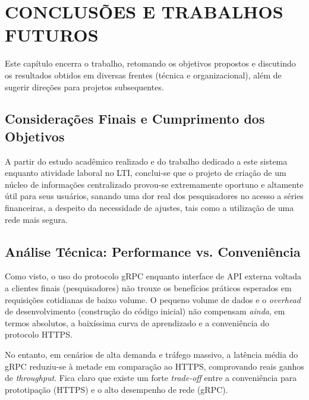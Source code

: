 \chapter{CONCLUSÕES E TRABALHOS FUTUROS}

Este capítulo encerra o trabalho, retomando os objetivos propostos e discutindo os resultados obtidos em diversas frentes (técnica e organizacional), além de sugerir direções para projetos subsequentes.

\section{Considerações Finais e Cumprimento dos Objetivos}

A partir do estudo acadêmico realizado e do trabalho dedicado a este sistema enquanto atividade laboral no LTI, conclui-se que o projeto de criação de um núcleo de informações centralizado provou-se extremamente oportuno e altamente útil para seus usuários, sanando uma dor real dos pesquisadores no acesso a séries financeiras, a despeito da necessidade de ajustes, tais como a utilização de uma rede mais segura.

\section{Análise Técnica: Performance vs. Conveniência}

Como visto, o uso do protocolo gRPC enquanto interface de API externa voltada a clientes finais (pesquisadores) não trouxe os benefícios práticos esperados em requisições cotidianas de baixo volume. O pequeno volume de dados e o \textit{overhead} de desenvolvimento (construção do código inicial) não compensam \textit{ainda}, em termos absolutos, a baixíssima curva de aprendizado e a conveniência do protocolo HTTPS. 

No entanto, em cenários de alta demanda e tráfego massivo, a latência média do gRPC reduziu-se à metade em comparação ao HTTPS, comprovando reais ganhos de \textit{throughput}. Fica claro que existe um forte \textit{trade-off} entre a conveniência para prototipação (HTTPS) e o alto desempenho de rede (gRPC). 

